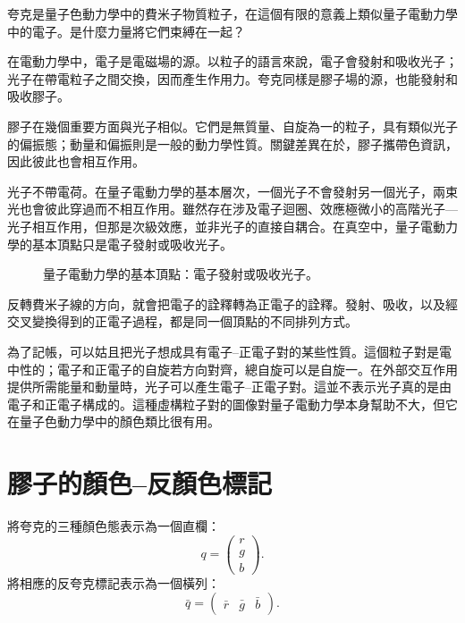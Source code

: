 夸克是量子色動力學中的費米子物質粒子，在這個有限的意義上類似量子電動力學中的電子。是什麼力量將它們束縛在一起？

在電動力學中，電子是電磁場的源。以粒子的語言來說，電子會發射和吸收光子；光子在帶電粒子之間交換，因而產生作用力。夸克同樣是膠子場的源，也能發射和吸收膠子。

膠子在幾個重要方面與光子相似。它們是無質量、自旋為一的粒子，具有類似光子的偏振態；動量和偏振則是一般的動力學性質。關鍵差異在於，膠子攜帶色資訊，因此彼此也會相互作用。

光子不帶電荷。在量子電動力學的基本層次，一個光子不會發射另一個光子，兩束光也會彼此穿過而不相互作用。雖然存在涉及電子迴圈、效應極微小的高階光子—光子相互作用，但那是次級效應，並非光子的直接自耦合。在真空中，量子電動力學的基本頂點只是電子發射或吸收光子。

\begin{figure}[h]
\centering
{}
\caption{量子電動力學的基本頂點：電子發射或吸收光子。}
\end{figure}

反轉費米子線的方向，就會把電子的詮釋轉為正電子的詮釋。發射、吸收，以及經交叉變換得到的正電子過程，都是同一個頂點的不同排列方式。

為了記帳，可以姑且把光子想成具有電子--正電子對的某些性質。這個粒子對是電中性的；電子和正電子的自旋若方向對齊，總自旋可以是自旋一。在外部交互作用提供所需能量和動量時，光子可以產生電子--正電子對。這並不表示光子真的是由電子和正電子構成的。這種虛構粒子對的圖像對量子電動力學本身幫助不大，但它在量子色動力學中的顏色類比很有用。

\section{膠子的顏色--反顏色標記}

將夸克的三種顏色態表示為一個直欄：
\begin{equation}
q=
\begin{pmatrix}
r\\
g\\
b
\end{pmatrix}.
\end{equation}
將相應的反夸克標記表示為一個橫列：
\begin{equation}
\bar q=
\begin{pmatrix}
\bar r&\bar g&\bar b
\end{pmatrix}.
\end{equation}

